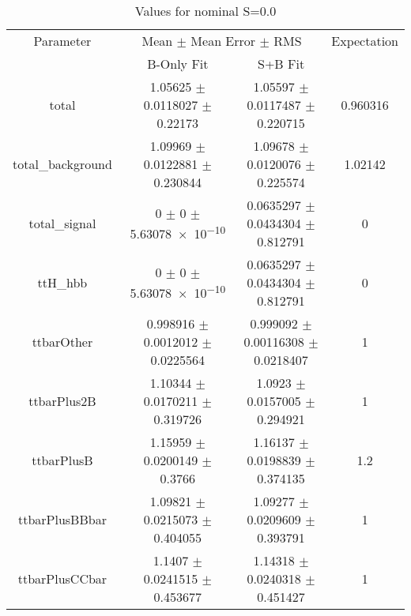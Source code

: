 \begin{table}
\centering
\caption{Values for nominal S=0.0}
\begin{tabular}{cccc}
\toprule
Parameter & \multicolumn{2}{c}{Mean $\pm$ Mean Error $\pm$ RMS} & Expectation\\
 & B-Only Fit & S+B Fit & \\
\midrule
total & \num{1.05625} $\pm$ \num{0.0118027} $\pm$ \num{0.22173} & \num{1.05597} $\pm$ \num{0.0117487} $\pm$ \num{0.220715} & \num{0.960316}\\
total\_background & \num{1.09969} $\pm$ \num{0.0122881} $\pm$ \num{0.230844} & \num{1.09678} $\pm$ \num{0.0120076} $\pm$ \num{0.225574} & \num{1.02142}\\
total\_signal & \num{0} $\pm$ \num{0} $\pm$ \num{5.63078e-10} & \num{0.0635297} $\pm$ \num{0.0434304} $\pm$ \num{0.812791} & \num{0}\\
ttH\_hbb & \num{0} $\pm$ \num{0} $\pm$ \num{5.63078e-10} & \num{0.0635297} $\pm$ \num{0.0434304} $\pm$ \num{0.812791} & \num{0}\\
ttbarOther & \num{0.998916} $\pm$ \num{0.0012012} $\pm$ \num{0.0225564} & \num{0.999092} $\pm$ \num{0.00116308} $\pm$ \num{0.0218407} & \num{1}\\
ttbarPlus2B & \num{1.10344} $\pm$ \num{0.0170211} $\pm$ \num{0.319726} & \num{1.0923} $\pm$ \num{0.0157005} $\pm$ \num{0.294921} & \num{1}\\
ttbarPlusB & \num{1.15959} $\pm$ \num{0.0200149} $\pm$ \num{0.3766} & \num{1.16137} $\pm$ \num{0.0198839} $\pm$ \num{0.374135} & \num{1.2}\\
ttbarPlusBBbar & \num{1.09821} $\pm$ \num{0.0215073} $\pm$ \num{0.404055} & \num{1.09277} $\pm$ \num{0.0209609} $\pm$ \num{0.393791} & \num{1}\\
ttbarPlusCCbar & \num{1.1407} $\pm$ \num{0.0241515} $\pm$ \num{0.453677} & \num{1.14318} $\pm$ \num{0.0240318} $\pm$ \num{0.451427} & \num{1}\\
\bottomrule
\end{tabular}
\end{table}